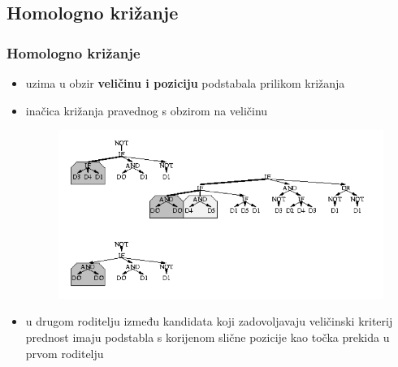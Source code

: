 \documentclass{beamer}
\begin{document}
\begin{frame}
{
}
\end{frame}


\subsection{Homologno križanje}
\begin{frame}
\frametitle{Homologno križanje}
\begin{itemize}
\item{uzima u obzir \textbf{veličinu i poziciju} podstabala prilikom križanja}
\item{inačica križanja pravednog s obzirom na veličinu}

\begin{figure}[H]
	\centering
	\includegraphics[scale=0.3]{./slike/crxHomo.png}
\end{figure}
\item{u drugom roditelju između kandidata koji zadovoljavaju veličinski kriterij prednost imaju podstabla s korijenom slične pozicije kao točka prekida u prvom roditelju}
\end{itemize}

\end{frame}
\end{document}
